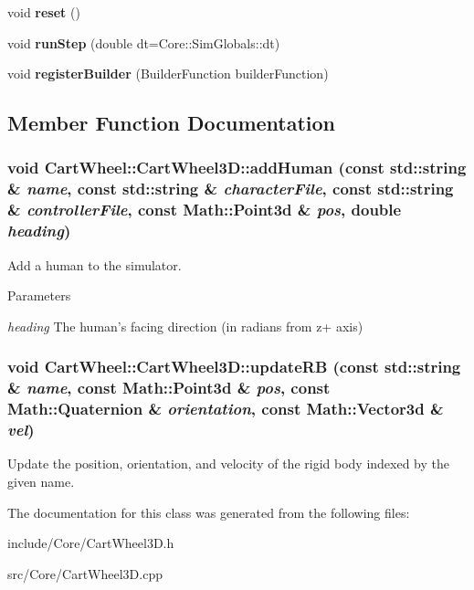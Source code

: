 \begin{DoxyCompactItemize}
\item 
\hypertarget{classCartWheel_1_1CartWheel3D_a29f2f3182b2f8e03488a7c0c346be6fb}{
void {\bfseries reset} ()}
\label{classCartWheel_1_1CartWheel3D_a29f2f3182b2f8e03488a7c0c346be6fb}

\item 
\hypertarget{classCartWheel_1_1CartWheel3D_a6304233b998161f81ed6389906cd9cd4}{
void {\bfseries runStep} (double dt=Core::SimGlobals::dt)}
\label{classCartWheel_1_1CartWheel3D_a6304233b998161f81ed6389906cd9cd4}

\item 
\hypertarget{classCartWheel_1_1CartWheel3D_ad733b26e5f0ccf3dc5406b37f20efed9}{
void {\bfseries registerBuilder} (BuilderFunction builderFunction)}
\label{classCartWheel_1_1CartWheel3D_ad733b26e5f0ccf3dc5406b37f20efed9}

\end{DoxyCompactItemize}


\subsection{Member Function Documentation}
\hypertarget{classCartWheel_1_1CartWheel3D_aa3a23d9a368df62279e75fb67ce1656e}{
\subsubsection[{addHuman}]{\setlength{\rightskip}{0pt plus 5cm}void CartWheel::CartWheel3D::addHuman (const std::string \& {\em name}, \/  const std::string \& {\em characterFile}, \/  const std::string \& {\em controllerFile}, \/  const {\bf Math::Point3d} \& {\em pos}, \/  double {\em heading})}}
\label{classCartWheel_1_1CartWheel3D_aa3a23d9a368df62279e75fb67ce1656e}
Add a human to the simulator.


\begin{DoxyParams}{Parameters}
\item[{\em heading}]The human's facing direction (in radians from z+ axis) \end{DoxyParams}
\hypertarget{classCartWheel_1_1CartWheel3D_ae988c01d49c442a2c9edb1798b3f897e}{
\subsubsection[{updateRB}]{\setlength{\rightskip}{0pt plus 5cm}void CartWheel::CartWheel3D::updateRB (const std::string \& {\em name}, \/  const {\bf Math::Point3d} \& {\em pos}, \/  const {\bf Math::Quaternion} \& {\em orientation}, \/  const {\bf Math::Vector3d} \& {\em vel})}}
\label{classCartWheel_1_1CartWheel3D_ae988c01d49c442a2c9edb1798b3f897e}
Update the position, orientation, and velocity of the rigid body indexed by the given name. 

The documentation for this class was generated from the following files:\begin{DoxyCompactItemize}
\item 
include/Core/CartWheel3D.h\item 
src/Core/CartWheel3D.cpp\end{DoxyCompactItemize}
